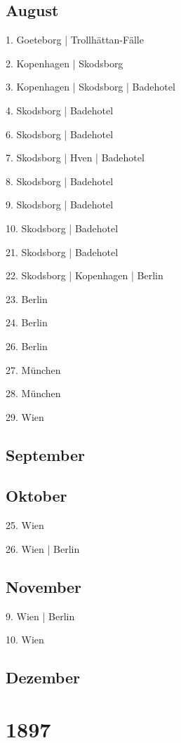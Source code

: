 \documentclass[twoside=false,titlepage=false,open=any, parskip=never, fontsize=10pt, headings=small, chapterprefix=false, appendixprefix=false, DIV=15]{scrbook}
\begin{document}
\begin{multicols}{3}
            \section*{August}
            1. Goeteborg | Trollhättan-Fälle\par
            2. Kopenhagen | Skodsborg\par
            3. Kopenhagen | Skodsborg | Badehotel\par
            4. Skodsborg | Badehotel\par
            6. Skodsborg | Badehotel\par
            7. Skodsborg | Hven | Badehotel\par
            8. Skodsborg | Badehotel\par
            9. Skodsborg | Badehotel\par
            10. Skodsborg | Badehotel\par
            21. Skodsborg | Badehotel\par
            22. Skodsborg | Kopenhagen | Berlin\par
            23. Berlin\par
            24. Berlin\par
            26. Berlin\par
            27. München\par
            28. München\par
            29. Wien\par
            \section*{September}
            \section*{Oktober}
            25. Wien\par
            26. Wien | Berlin\par
            \section*{November}
            9. Wien | Berlin\par
            10. Wien\par
            \section*{Dezember}
            \chapter*{1897}

\end{multicols}
\end{document}
